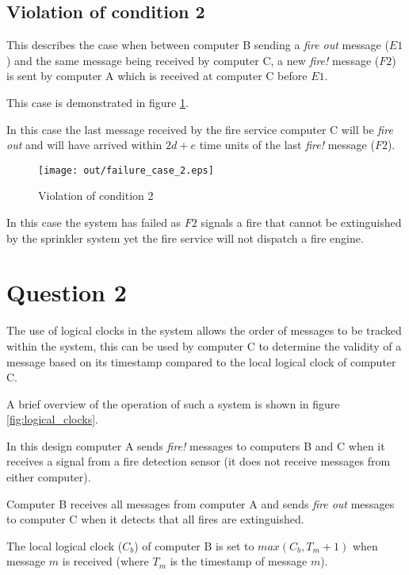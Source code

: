 \documentclass[twocolumn]{article}
\begin{document}
\subsection{Violation of condition 2}
\label{sec:violation_of_condition_2}

This describes the case when between computer B sending a \textit{fire out}
message ($E1$) and the same message being received by computer C, a new
\textit{fire!} message ($F2$) is sent by computer A which is received at
computer C before $E1$.

This case is demonstrated in figure \ref{fig:failure_case_2}.

In this case the last message received by the fire service computer C will be
\textit{fire out} and will have arrived within $2d + e$ time units of the last
\textit{fire!} message ($F2$).

\begin{figure}[h!]
  \centering
  \texttt{[image: out/failure\_case\_2.eps]}
  \caption{Violation of condition 2}
  \label{fig:failure_case_2}
\end{figure}

In this case the system has failed as $F2$ signals a fire that cannot be
extinguished by the sprinkler system yet the fire service will not dispatch a
fire engine.

\section{Question 2}

The use of logical clocks in the system allows the order of messages to be
tracked within the system, this can be used by computer C to determine the
validity of a message based on its timestamp compared to the local logical
clock of computer C.

A brief overview of the operation of such a system is shown in figure
\ref{fig:logical_clocks}.

In this design computer A sends \textit{fire!} messages to computers B and C
when it receives a signal from a fire detection sensor (it does not receive
messages from either computer).

Computer B receives all messages from computer A and sends \textit{fire out}
messages to computer C when it detects that all fires are extinguished.

The local logical clock ($C_{b}$) of computer B is set to $max(C_{b}, T_{m} +
1)$ when message $m$ is received (where $T_{m}$ is the timestamp of message
$m$).
\end{document}
